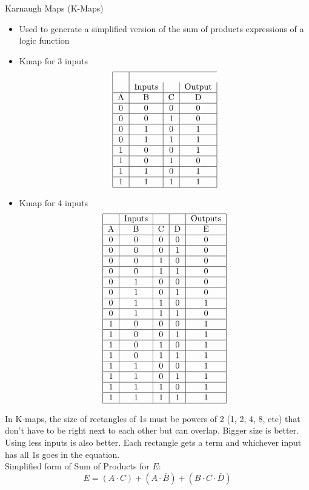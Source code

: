\documentclass[12pt]{article}
\begin{document}
Karnaugh Maps (K-Maps) \begin{itemize} 
\item Used to generate a simplified version of the sum of products expressions of a logic function 
\item Kmap for 3 inputs 
$$\begin{tabular}{|c|c|c|c|} \hline \\ 
& Inputs & & Output \\ \hline 
A & B & C & D \\ \hline 
0&0&0&0 \\ \hline 
0&0&1&0 \\ \hline 
0&1&0&1 \\ \hline 
0&1&1&1 \\ \hline 
1&0&0&1 \\ \hline 
1&0&1&0 \\ \hline 
1&1&0&1 \\ \hline 
1&1&1&1 \\ \hline \end{tabular} $$ 
\item Kmap for 4 inputs 
$$\begin{tabular}{|c|c|c|c|c|} \hline 
& Inputs & & & Outputs \\ \hline
A & B & C & D & E \\ \hline
0&0&0&0&0 \\ \hline 
0&0&0&1&0 \\ \hline 
0&0&1&0&0 \\ \hline 
0&0&1&1&0 \\ \hline 
0&1&0&0&0 \\ \hline 
0&1&0&1&0 \\ \hline 
0&1&1&0&1 \\ \hline 
0&1&1&1&0 \\ \hline 
1&0&0&0&1 \\ \hline 
1&0&0&1&1 \\ \hline 
1&0&1&0&1 \\ \hline 
1&0&1&1&1 \\ \hline 
1&1&0&0&1 \\ \hline 
1&1&0&1&1 \\ \hline 
1&1&1&0&1 \\ \hline 
1&1&1&1&1 \\ \hline \end{tabular} $$  \end{itemize} 

In K-maps, the size of rectangles of 1s must be powers of 2 (1, 2, 4, 8, etc) that don't have to be right next to each other but can overlap. Bigger size is better. Using less inputs is also better. Each rectangle gets a term and whichever input has all 1s goes in the equation. \\ Simplified form of Sum of Products for $E$: 
$$E = ( A \cdot C ) + ( A \cdot \bar{B} ) + ( B \cdot C \cdot \bar{D} ) $$ 
\end{document}
